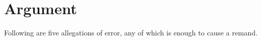 \documentclass[12pt,\documentclassflag]{michiganCourtOfAppealsBrief}
\begin{document}

	




\section{Argument}

Following are five allegations of error, any of which is enough to cause a remand. 
\end{document}
